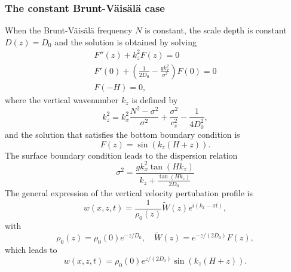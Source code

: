 \subsubsection{The constant Brunt-V\"ais\"al\"a case}
When the Brunt-V\"ais\"al\"a frequency $N$ is constant, the scale depth is constant $D(z)=D_0$ and the solution is obtained by solving
\[
\begin{array}{l}
\displaystyle
F''(z)
+
k_z^2
F(z)=0\\[4mm]
\displaystyle
F'(0)+\left(
\frac{1}{2D_0}-\frac{gk_x^2}{\sigma^2}
\right)F(0)=0\\[4mm]
\displaystyle
F(-H)=0,
\end{array}
\]
where the vertical wavenumber $k_z$ is defined by
\begin{equation}
k_z^2=k_x^2\frac{N^2-\sigma^2}{\sigma^2}+\frac{\sigma^2}{c_s^2}-\frac{1}{4D_0^2},
\label{defkz}
\end{equation}
and the solution that satisfies the bottom boundary condition is
\[
F(z)=\sin(k_z(H+z)).
\]
The surface boundary condition leads to the dispersion relation
\begin{equation}
\sigma^2=\frac{gk_x^2\tan(Hk_z)}{k_z+\frac{\tan(Hk_z)}{2
D_0}}
\label{eqdispsersurf}
\end{equation}
The general expression of the vertical velocity pertubation profile is
\[
w(x,z,t)=\frac{1}{\rho_0(z)}\widetilde{W}(z)e^{i(k_x-\sigma t)},
\]
with 
\[
\rho_0(z)=\rho_0(0)e^{-z/D_0},\quad \widetilde{W}(z)=e^{-z/(2D_0)}F(z),
\]
which leads to
\[
w(x,z,t)=\rho_0(0)e^{z/(2D_0)}\sin(k_z(H+z)).
\]




